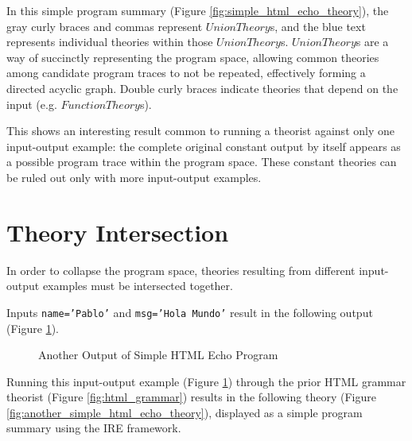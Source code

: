 In this simple program summary (Figure \ref{fig:simple_html_echo_theory}), the gray curly braces and commas represent $UnionTheory$s, and the blue text represents individual theories within those $UnionTheory$s.
$UnionTheory$s are a way of succinctly representing the program space, allowing common theories among candidate program traces to not be repeated, effectively forming a directed acyclic graph.
Double curly braces indicate theories that depend on the input (e.g. $FunctionTheory$s).

This shows an interesting result common to running a theorist against only one input-output example: the complete original constant output by itself appears as a possible program trace within the program space.
These constant theories can be ruled out only with more input-output examples.

\section{Theory Intersection}
\label{sec:theory_intersection}

In order to collapse the program space, theories resulting from different input-output examples must be intersected together.


Inputs \texttt{name='Pablo'} and \texttt{msg='Hola Mundo'} result in the following output (Figure \ref{fig:another_output_of_simple_html_echo_program}).

\begin{figure}[H]
\caption{Another Output of Simple HTML Echo Program}
\label{fig:another_output_of_simple_html_echo_program}
\end{figure}

Running this input-output example (Figure \ref{fig:another_output_of_simple_html_echo_program}) through the prior HTML grammar theorist (Figure \ref{fig:html_grammar}) results in the following theory (Figure \ref{fig:another_simple_html_echo_theory}), displayed as a simple program summary using the IRE framework.

